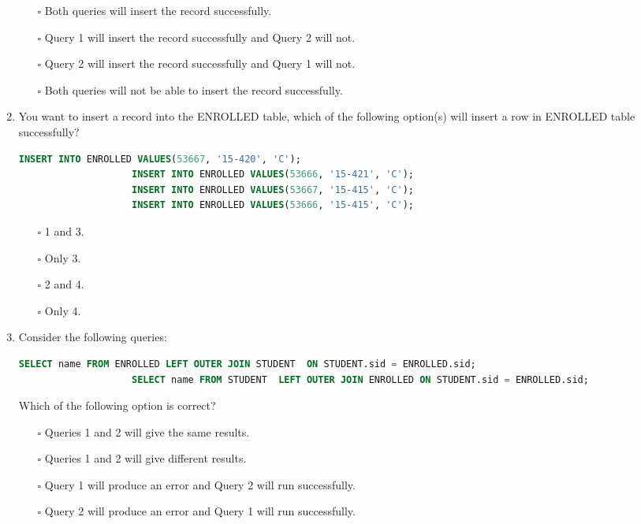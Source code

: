 \documentclass[10pt]{article}
\begin{document}
\begin{enumerate}
				\begin{enumerate}
					\item[$\square$] Both queries will insert the record successfully.
					\item[$\square$] Query 1 will insert the record successfully and Query 2 will not.
					\item[$\square$] Query 2 will insert the record successfully and Query 1 will not.
					\item[$\square$] Both queries will not be able to insert the record successfully.
				\end{enumerate}

			\item You want to insert a record into the ENROLLED table, which of the following option(s) will insert a row in ENROLLED table successfully?
				\begin{lstlisting}[language=SQL,firstline=1, lastline=4] 
					INSERT INTO ENROLLED VALUES(53667, '15-420', 'C');
					INSERT INTO ENROLLED VALUES(53666, '15-421', 'C');
					INSERT INTO ENROLLED VALUES(53667, '15-415', 'C');
					INSERT INTO ENROLLED VALUES(53666, '15-415', 'C');
				\end{lstlisting}

				\begin{enumerate}
					\item[$\square$] 1 and 3.
					\item[$\square$] Only 3.
					\item[$\square$] 2 and 4.
					\item[$\square$] Only 4.
				\end{enumerate}
			
			\item Consider the following queries:
				\begin{lstlisting}[language=SQL,firstline=1, lastline=2] 
					SELECT name FROM ENROLLED LEFT OUTER JOIN STUDENT  ON STUDENT.sid = ENROLLED.sid;
					SELECT name FROM STUDENT  LEFT OUTER JOIN ENROLLED ON STUDENT.sid = ENROLLED.sid;
				\end{lstlisting}
				Which of the following option is correct?
				\begin{enumerate}
					\item[$\square$] Queries 1 and 2 will give the same results.
					\item[$\square$] Queries 1 and 2 will give different results.
					\item[$\square$] Query 1 will produce an error and Query 2 will run successfully.
					\item[$\square$] Query 2 will produce an error and Query 1 will run successfully.
				\end{enumerate}


\end{enumerate}
\end{document}
